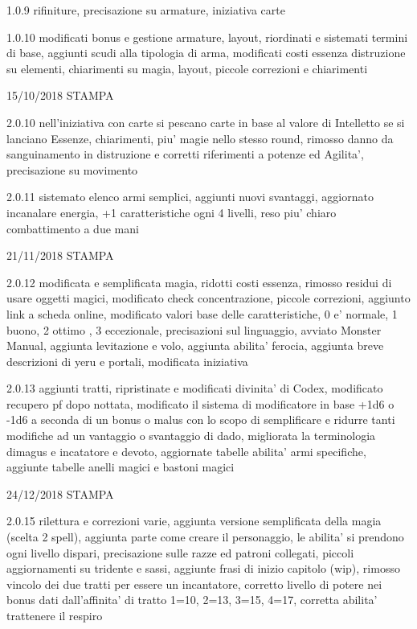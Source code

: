 \documentclass[a4paper,11pt,twoside,openany]{book}
\begin{document}
{{1.0.9 rifiniture, precisazione su armature, iniziativa carte 

1.0.10 modificati bonus e gestione armature, layout, riordinati e sistemati termini di base, aggiunti scudi alla tipologia di arma, modificati costi essenza distruzione su elementi, chiarimenti su magia, layout, piccole correzioni e chiarimenti

15/10/2018 STAMPA

2.0.10 nell'iniziativa con carte si pescano carte in base al valore di Intelletto se si lanciano Essenze, chiarimenti, piu' magie nello stesso round, rimosso danno da sanguinamento in distruzione e corretti riferimenti a potenze ed Agilita', precisazione su movimento

2.0.11 sistemato elenco armi semplici, aggiunti nuovi svantaggi, aggiornato incanalare energia, +1 caratteristiche ogni 4 livelli, reso piu' chiaro combattimento a due mani

21/11/2018 STAMPA

2.0.12 modificata e semplificata magia, ridotti costi essenza, rimosso residui di usare oggetti magici, modificato check concentrazione, piccole correzioni, aggiunto link a scheda online, modificato valori base delle caratteristiche, 0 e' normale, 1 buono, 2 ottimo , 3 eccezionale, precisazioni sul linguaggio, avviato Monster Manual, aggiunta levitazione e volo, aggiunta abilita' ferocia, aggiunta breve descrizioni di yeru e portali, modificata iniziativa

2.0.13 aggiunti tratti, ripristinate e modificati divinita' di Codex, modificato recupero pf dopo nottata, modificato il sistema di modificatore in base +1d6 o -1d6 a seconda di un bonus o malus con lo scopo di semplificare e ridurre tanti modifiche ad un vantaggio o svantaggio di dado, migliorata la terminologia dimagus e incatatore e devoto, aggiornate tabelle abilita' armi specifiche, aggiunte tabelle anelli magici e bastoni magici

24/12/2018 STAMPA

2.0.15 rilettura e correzioni varie, aggiunta versione semplificata della magia (scelta 2 spell), aggiunta parte come creare il personaggio, le abilita' si prendono ogni livello dispari, precisazione sulle razze ed patroni collegati, piccoli aggiornamenti su tridente e sassi, aggiunte frasi di inizio capitolo (wip), rimosso vincolo dei due tratti per essere un incantatore, corretto livello di potere nei bonus dati dall'affinita' di tratto 1=10, 2=13, 3=15, 4=17, corretta abilita' trattenere il respiro

}}
\end{document}
